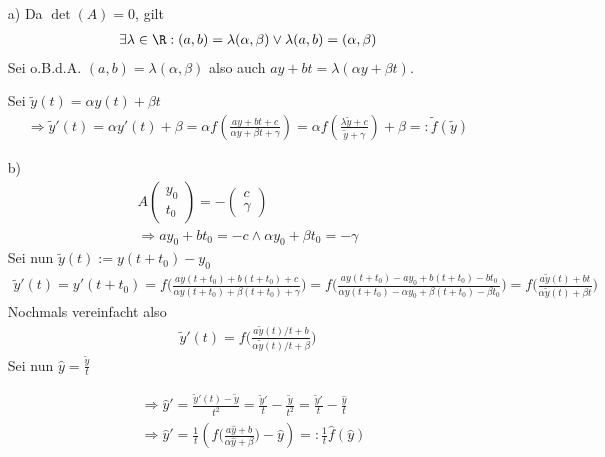 \begin{solution}
\begin{itemize}
  \item[a)]
  Da $\det(A) = 0$, gilt
  \begin{align*}
    \exists \lambda \in \R: (a,b) = \lambda (\alpha, \beta) \lor \lambda (a,b) = (\alpha, \beta)
  \end{align*}
  Sei o.B.d.A. $(a,b) = \lambda (\alpha, \beta)$ also auch $ay + bt = \lambda (\alpha y + \beta t)$.

  Sei $\tilde{y}(t) = \alpha y(t) + \beta t$
  \begin{align*}
    \Rightarrow \tilde{y}'(t) = \alpha y'(t) + \beta = \alpha f(\frac{ay + bt + c}{\alpha y + \beta t + \gamma}) = \alpha f(\frac{\lambda \tilde{y} + c}{\tilde{y} + \gamma}) + \beta =: \tilde{f}(\tilde{y})
  \end{align*}

  \item[b)]
  \begin{align*}
    A\left(
    \begin{array}{c}
      y_0 \\
      t_0
    \end{array}
    \right) = -\left(
    \begin{array}{c}
      c \\
      \gamma
    \end{array}
    \right) \\
    \Rightarrow ay_0 + bt_0 = -c \land \alpha y_0 + \beta t_0 = -\gamma
  \end{align*}
  Sei nun $\tilde{y}(t) := y(t + t_0 ) - y_0$
  \begin{align*}
    \tilde{y}'(t) = y'(t + t_0 ) = f \bigg(\frac{ay(t+t_0) + b(t+t_0) + c}{\alpha y(t+t_0) + \beta (t+t_0) + \gamma}\bigg) = f\bigg(\frac{ay(t+t_0) - ay_0 + b(t+t_0) - bt_0}{\alpha y(t+t_0) -\alpha y_0 + \beta (t+t_0) - \beta t_0}
    \bigg) = f \bigg(\frac{a\tilde{y}(t) + bt}{\alpha \tilde{y}(t) + \beta t}\bigg)
  \end{align*}
  Nochmals vereinfacht also
  \begin{align*}
    \tilde{y}'(t) = f \bigg(\frac{a\tilde{y}(t)/t + b}{\alpha \tilde{y}(t)/t + \beta }\bigg)
  \end{align*}
  Sei nun $\hat{y} = \frac{\tilde{y}}{t}$

  \begin{align*}
    &\Rightarrow \hat{y}' = \frac{\tilde{y}'(t) - \tilde{y}}{t^{2}} = \frac{\tilde{y}'}{t} - \frac{\tilde{y}}{t^{2}} = \frac{\tilde{y}'}{t} - \frac{\hat{y}}{t} \\
    &\Rightarrow \hat{y}' = \frac{1}{t} (f \bigg(\frac{a\hat{y} + b}{\alpha \hat{y} + \beta }\bigg) - \hat{y}) =: \frac{1}{t} \hat{f}(\hat{y})
  \end{align*}
\end{itemize}
\end{solution}
